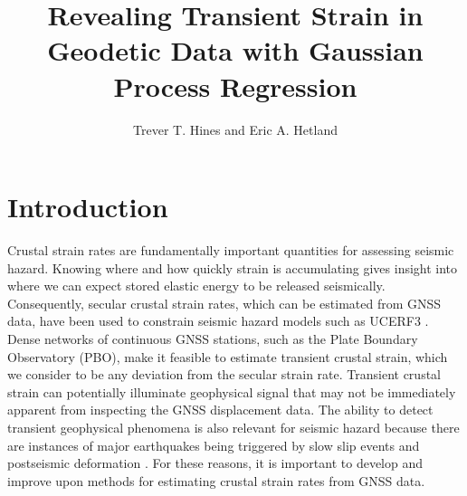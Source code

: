 \documentclass[10pt,letter]{article}
\title{Revealing Transient Strain in Geodetic Data with Gaussian Process Regression}
\author{Trever T. Hines and Eric A. Hetland}
\begin{document}
\maketitle


\section{Introduction}\label{sec:Introduction}
Crustal strain rates are fundamentally important quantities for assessing seismic hazard. Knowing where and how quickly strain is accumulating gives insight into where we can expect stored elastic energy to be released seismically. Consequently, secular crustal strain rates, which can be estimated from GNSS data, have been used to constrain seismic hazard models such as UCERF3 \citep{Field2014}. Dense networks of continuous GNSS stations, such as the Plate Boundary Observatory (PBO), make it feasible to estimate transient crustal strain, which we consider to be any deviation from the secular strain rate.  Transient crustal strain can potentially illuminate geophysical signal that may not be immediately apparent from inspecting the GNSS displacement data. The ability to detect transient geophysical phenomena is also relevant for seismic hazard because there are instances of major earthquakes being triggered by slow slip events \citep{Roeloffs2006} and postseismic deformation \citep{Freed2001}. For these reasons, it is important to develop and improve upon methods for estimating crustal strain rates from GNSS data.
\end{document}
